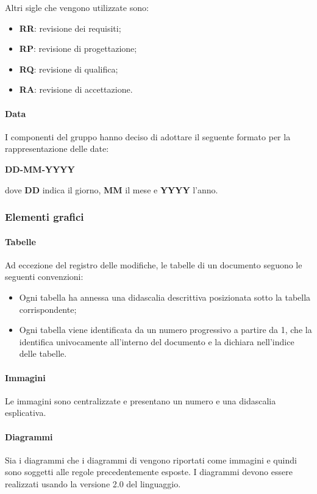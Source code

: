 Altri sigle che vengono utilizzate sono:
\begin{itemize}
	\item \textbf{RR}: revisione dei requisiti;
	\item \textbf{RP}: revisione di progettazione;
	\item \textbf{RQ}: revisione di qualifica;
	\item \textbf{RA}: revisione di accettazione.
\end{itemize}

\paragraph{Data}
I componenti del gruppo hanno deciso di adottare il seguente formato per la rappresentazione delle date:
\begin{center}
\textbf{DD-MM-YYYY}
\end{center}
dove \textbf{DD} indica il giorno, \textbf{MM} il mese e \textbf{YYYY} l'anno.

\subsubsection{Elementi grafici}
\paragraph{Tabelle}
Ad eccezione del registro delle modifiche, le tabelle di un documento seguono le seguenti convenzioni:
\begin{itemize}

	\item Ogni tabella ha annessa una didascalia descrittiva posizionata sotto la tabella corrispondente;
	
	\item Ogni tabella viene identificata da un numero progressivo a partire da 1, che la identifica univocamente all'interno del documento e la dichiara nell'indice delle tabelle.
\end{itemize}

\paragraph{Immagini}
Le immagini sono centralizzate e presentano un numero e una didascalia esplicativa.

\paragraph{Diagrammi}
Sia i diagrammi  che i diagrammi di  vengono riportati come immagini e quindi sono soggetti alle regole precedentemente esposte. I diagrammi  devono essere realizzati usando la versione 2.0 del linguaggio.

